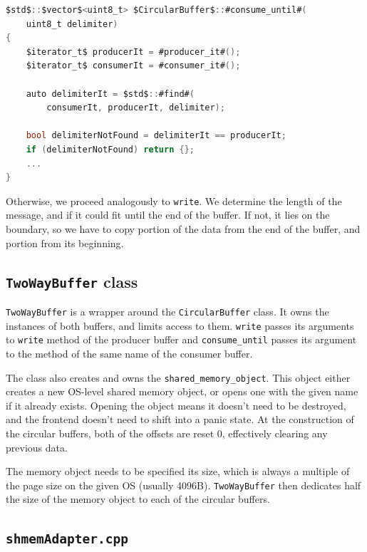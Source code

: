 \begin{lstlisting}[language=csharp, caption={Finding delimiter using the \texttt{std::find} function}]
$std$::$vector$<uint8_t> $CircularBuffer$::#consume_until#(
    uint8_t delimiter)
{
    $iterator_t$ producerIt = #producer_it#();
    $iterator_t$ consumerIt = #consumer_it#();

    auto delimiterIt = $std$::#find#(
        consumerIt, producerIt, delimiter);

    bool delimiterNotFound = delimiterIt == producerIt;
    if (delimiterNotFound) return {};
    ...
}
\end{lstlisting}

Otherwise, we proceed analogously to \texttt{write}. We determine the length of the message, and if it could fit until the end of the buffer. If not, it lies on the boundary, so we have to copy portion of the data from the end of the buffer, and portion from its beginning.

\subsection{\texttt{TwoWayBuffer} class}

\texttt{TwoWayBuffer} is a wrapper around the \texttt{CircularBuffer} class. It owns the instances of both buffers, and limits access to them. \texttt{write} passes its arguments to \texttt{write} method of the producer buffer and \texttt{consume\_until} passes its argument to the method of the same name of the consumer buffer.

The class also creates and owns the \texttt{shared\_memory\_object}. This object either creates a new OS-level shared memory object, or opens one with the given name if it already exists. Opening the object means it doesn't need to be destroyed, and the frontend doesn't need to shift into a panic state. At the construction of the circular buffers, both of the offsets are reset 0, effectively clearing any previous data.

The memory object needs to be specified its size, which is always a multiple of the page size on the given OS (usually 4096B). \texttt{TwoWayBuffer} then dedicates half the size of the memory object to each of the circular buffers.

\subsection{\texttt{shmemAdapter.cpp}} \label{subsec:shmemadapter}

